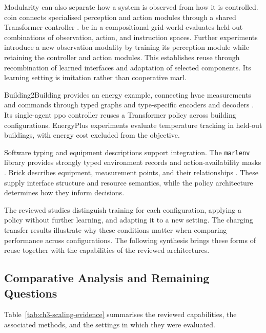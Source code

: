 Modularity can also separate how a system is observed from how it is controlled. \gls{coin} connects specialised perception and action modules through a shared Transformer controller \parencite{luketina2025compositional}. \gls{bc} in a compositional grid-world evaluates held-out combinations of observation, action, and instruction spaces. Further experiments introduce a new observation modality by training its perception module while retaining the controller and action modules. This establishes reuse through recombination of learned interfaces and adaptation of selected components. Its learning setting is imitation rather than cooperative \gls{marl}.

Building2Building provides an energy example, connecting \gls{hvac} measurements and commands through typed graphs and type-specific encoders and decoders \parencite{taboga2026building2building}. Its single-agent \gls{ppo} controller reuses a Transformer policy across building configurations. EnergyPlus experiments evaluate temperature tracking in held-out buildings, with energy cost excluded from the objective.

Software typing and equipment descriptions support integration. The \texttt{marlenv} library provides strongly typed environment records and action-availability masks \parencite{marlenv2026software}. Brick describes equipment, measurement points, and their relationships \parencite{balaji2018brick}. These supply interface structure and resource semantics, while the policy architecture determines how they inform decisions.

The reviewed studies distinguish training for each configuration, applying a policy without further learning, and adapting it to a new setting. The charging transfer results illustrate why these conditions matter when comparing performance across configurations. The following synthesis brings these forms of reuse together with the capabilities of the reviewed architectures.

\subsection{Comparative Analysis and Remaining Questions}
\label{sec:ch3-scalability-gaps}
\label{sec:ch2-gap-rq1}

Table~\ref{tab:ch3-scaling-evidence} summarises the reviewed capabilities, the associated methods, and the settings in which they were evaluated.

